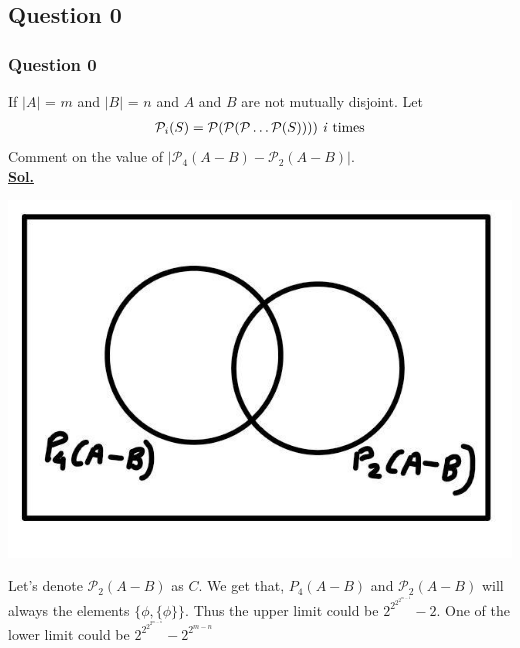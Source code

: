 \documentclass[xcolor=svgnames]{beamer}
\begin{document}
\subsection{Question 0}
\begin{frame}
\frametitle{Question 0}
If $|A|$ = $m$ and $|B|$ = $n$ and $A$ and $B$ are not mutually disjoint. Let
\begin{align*}
\mathcal{P}_i(S) = \mathcal{P}(\mathcal{P}(\mathcal{P}\ldots \mathcal{P}(S)))) \text{  \textit{i}}  \text{    times}
\end{align*}
Comment on the value of $|\mathcal{P}_4(A-B) -  \mathcal{P}_2(A-B)|$. \\
\textbf{\underline{Sol.}} 
\begin{multicols}{2}
\begin{center}
    \includegraphics[width=0.9\linewidth]{photo_2020-09-22_22-35-08.jpg}
\end{center}

Let's denote $\mathcal{P}_2(A - B)$ as $C$. We get that, $P_4(A-  B)$  and $\mathcal{P}_2(A - B)$ will always the elements $\{\phi,\{\phi\}\}$. Thus the upper limit could be $2^{2^{2^{2^{m - 1}}}} - 2$. One of the lower limit could be $2^{2^{2^{2^{m - n}}}} - 2^{2^{m - n}}$
\end{multicols}
\end{frame}


\end{document}
